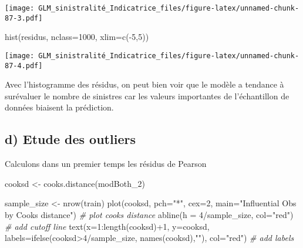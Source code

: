 \documentclass[
]{article}
\newenvironment{Shaded}{\begin{snugshade}}{\end{snugshade}}
\newcommand{\AttributeTok}[1]{\textcolor[rgb]{0.77,0.63,0.00}{#1}}
\newcommand{\CommentTok}[1]{\textcolor[rgb]{0.56,0.35,0.01}{\textit{#1}}}
\newcommand{\DecValTok}[1]{\textcolor[rgb]{0.00,0.00,0.81}{#1}}
\newcommand{\FunctionTok}[1]{\textcolor[rgb]{0.00,0.00,0.00}{#1}}
\newcommand{\NormalTok}[1]{#1}
\newcommand{\OtherTok}[1]{\textcolor[rgb]{0.56,0.35,0.01}{#1}}
\newcommand{\SpecialCharTok}[1]{\textcolor[rgb]{0.00,0.00,0.00}{#1}}
\newcommand{\StringTok}[1]{\textcolor[rgb]{0.31,0.60,0.02}{#1}}
\begin{document}
\texttt{[image: GLM\_sinistralité\_Indicatrice\_files/figure-latex/unnamed-chunk-87-3.pdf]}

\begin{Shaded}
\begin{Highlighting}[]
\FunctionTok{hist}\NormalTok{(residus, }\AttributeTok{nclass=}\DecValTok{1000}\NormalTok{, }\AttributeTok{xlim=}\FunctionTok{c}\NormalTok{(}\SpecialCharTok{{-}}\DecValTok{5}\NormalTok{,}\DecValTok{5}\NormalTok{))}
\end{Highlighting}
\end{Shaded}

\texttt{[image: GLM\_sinistralité\_Indicatrice\_files/figure-latex/unnamed-chunk-87-4.pdf]}

Avec l'histogramme des résidus, on peut bien voir que le modèle a
tendance à surévaluer le nombre de sinistres car les valeurs importantes
de l'échantillon de données biaisent la prédiction.

\hypertarget{d-etude-des-outliers}{%
\subsection{d) Etude des outliers}\label{d-etude-des-outliers}}

Calculons dans un premier temps les résidus de Pearson

\begin{Shaded}
\end{Shaded}

\begin{Shaded}
\begin{Highlighting}[]
\NormalTok{cooksd }\OtherTok{\textless{}{-}} \FunctionTok{cooks.distance}\NormalTok{(modBoth\_2)}

\NormalTok{sample\_size }\OtherTok{\textless{}{-}} \FunctionTok{nrow}\NormalTok{(train)}
\FunctionTok{plot}\NormalTok{(cooksd, }\AttributeTok{pch=}\StringTok{"*"}\NormalTok{, }\AttributeTok{cex=}\DecValTok{2}\NormalTok{, }\AttributeTok{main=}\StringTok{"Influential Obs by Cooks distance"}\NormalTok{)  }\CommentTok{\# plot cook\textquotesingle{}s distance}
\FunctionTok{abline}\NormalTok{(}\AttributeTok{h =} \DecValTok{4}\SpecialCharTok{/}\NormalTok{sample\_size, }\AttributeTok{col=}\StringTok{"red"}\NormalTok{)  }\CommentTok{\# add cutoff line}
\FunctionTok{text}\NormalTok{(}\AttributeTok{x=}\DecValTok{1}\SpecialCharTok{:}\FunctionTok{length}\NormalTok{(cooksd)}\SpecialCharTok{+}\DecValTok{1}\NormalTok{, }\AttributeTok{y=}\NormalTok{cooksd, }\AttributeTok{labels=}\FunctionTok{ifelse}\NormalTok{(cooksd}\SpecialCharTok{\textgreater{}}\DecValTok{4}\SpecialCharTok{/}\NormalTok{sample\_size, }\FunctionTok{names}\NormalTok{(cooksd),}\StringTok{""}\NormalTok{), }\AttributeTok{col=}\StringTok{"red"}\NormalTok{)  }\CommentTok{\# add labels}
\end{Highlighting}
\end{Shaded}
\end{document}
